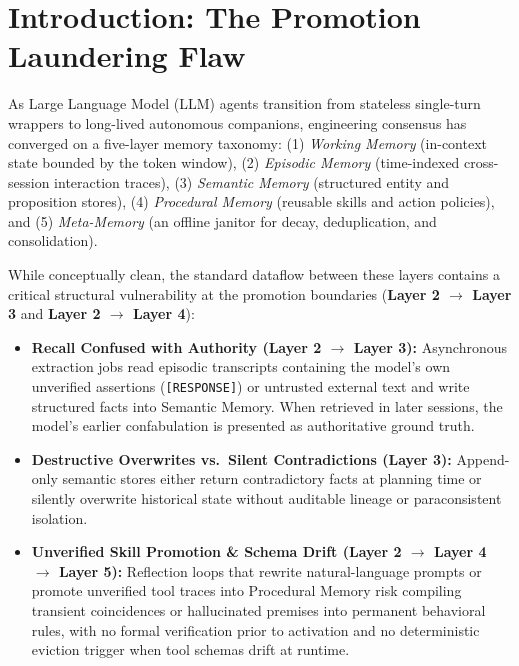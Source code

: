 \documentclass[11pt,a4paper]{article}
\begin{document}
\begin{abstract}
\textbf{23.3\% (7/30) to 70.0\% (21/30)} (0:14 discordant pairs, McNemar $p = 0.0001$) at \textbf{8.1 ms} mean retrieval latency. Finally, at the \textbf{Layer 4 \& Layer 5 boundary}, we evaluate an organic \textbf{52-turn live LLM waking trace + 16 held-out evaluation turns (\texttt{IN-D} baseline)}: offline \texttt{DreamRetrospective} induces gas-metered MicroScheme AST rules (\texttt{0.14 ms} CPU reflex execution vs.\ \texttt{462.46 ms} LLM planning), admitting \textbf{4/4 structured tool-rule candidates to \texttt{QUARANTINE}} after Z3 SMT verification and 50-turn historical replay, achieving \textbf{8/8 (100.0\%) held-out positive recall} and \textbf{0/8 (0.0\%) distractor misfires} under a single-strike runtime eviction circuit breaker.
\end{abstract}

\section{Introduction: The Promotion Laundering Flaw}
As Large Language Model (LLM) agents transition from stateless single-turn wrappers to long-lived autonomous companions, engineering consensus has converged on a five-layer memory taxonomy: (1) \emph{Working Memory} (in-context state bounded by the token window), (2) \emph{Episodic Memory} (time-indexed cross-session interaction traces), (3) \emph{Semantic Memory} (structured entity and proposition stores), (4) \emph{Procedural Memory} (reusable skills and action policies), and (5) \emph{Meta-Memory} (an offline janitor for decay, deduplication, and consolidation).

While conceptually clean, the standard dataflow between these layers contains a critical structural vulnerability at the promotion boundaries (\textbf{Layer 2 $\to$ Layer 3} and \textbf{Layer 2 $\to$ Layer 4}):
\begin{itemize}
    \item \textbf{Recall Confused with Authority (Layer 2 $\to$ Layer 3):} Asynchronous extraction jobs read episodic transcripts containing the model's own unverified assertions (\texttt{[RESPONSE]}) or untrusted external text and write structured facts into Semantic Memory. When retrieved in later sessions, the model's earlier confabulation is presented as authoritative ground truth.
    \item \textbf{Destructive Overwrites vs.\ Silent Contradictions (Layer 3):} Append-only semantic stores either return contradictory facts at planning time or silently overwrite historical state without auditable lineage or paraconsistent isolation.
    \item \textbf{Unverified Skill Promotion \& Schema Drift (Layer 2 $\to$ Layer 4 $\to$ Layer 5):} Reflection loops that rewrite natural-language prompts or promote unverified tool traces into Procedural Memory risk compiling transient coincidences or hallucinated premises into permanent behavioral rules, with no formal verification prior to activation and no deterministic eviction trigger when tool schemas drift at runtime.
\end{itemize}
\end{document}
